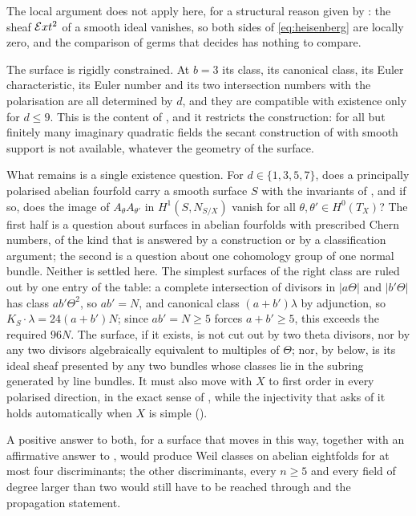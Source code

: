 \begin{remark}\label{rem:smoothremains}
The local argument does not apply here, for a structural reason given by
: the sheaf $\mathcal{E} xt^{2}$ of a smooth ideal vanishes,
so both sides of \eqref{eq:heisenberg} are locally zero, and the comparison of
germs that decides  has nothing to compare.

The surface is rigidly constrained. At $b=3$ its class, its canonical class,
its Euler characteristic, its Euler number and its two intersection numbers
with the polarisation are all determined by $d$, and they are compatible with
existence only for $d\le9$. This is the content of
, and it restricts the construction: for all but
finitely many imaginary quadratic fields the secant construction of
 with smooth support is not available, whatever the
geometry of the surface.

What remains is a single existence question. For $d\in\{1,3,5,7\}$, does a
principally polarised abelian fourfold carry a smooth surface $S$ with the
invariants of , and if so, does the image of
$A_{\theta}A_{\theta'}$ in $H^{1}(S,N_{S/X})$ vanish for all
$\theta,\theta'\in H^{0}(T_{X})$? The first half is a question about surfaces
in abelian fourfolds with prescribed Chern numbers, of the kind that is
answered by a construction or by a classification argument; the second is a
question about one cohomology group of one normal bundle. Neither is settled
here. The simplest surfaces of the right class are ruled out by one entry of
the table: a complete intersection of divisors in $|a\Theta|$ and
$|b'\Theta|$ has class $ab'\Theta^{2}$, so $ab'=N$, and canonical class
$(a+b')\lambda$ by adjunction, so $K_{S}\cdot\lambda=24(a+b')N$; since
$ab'=N\ge5$ forces $a+b'\ge5$, this exceeds the required $96N$. The
surface, if it exists, is not cut out by two theta divisors, nor by any two
divisors algebraically equivalent to multiples of $\Theta$; nor, by
 below, is its ideal sheaf presented by any two bundles
whose classes lie in the subring generated by line bundles. It must also move
with $X$ to first order in every polarised direction, in the exact sense of
, while the injectivity that 
asks of it holds automatically when $X$ is simple ().

A positive answer to both, for a surface that moves in this way, together
with an affirmative answer to \cite[Question 11.4]{Mar25b}, would produce
Weil classes on abelian
eightfolds for at most four discriminants; the other discriminants, every
$n\ge5$ and every field of degree larger than two would still have to be
reached through  and the propagation statement.
\end{remark}


